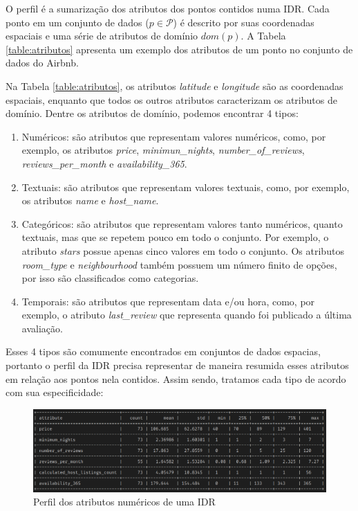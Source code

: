 O perfil é a sumarização dos atributos dos pontos contidos numa IDR. Cada ponto em um conjunto de dados ($p \in \mathcal{P}$) é descrito por suas coordenadas espaciais e uma série de atributos de domínio $dom(p)$. A Tabela \ref{table:atributos} apresenta um exemplo dos atributos de um ponto no conjunto de dados do Airbnb.

Na Tabela \ref{table:atributos}, os atributos {\em latitude} e {\em longitude} são as coordenadas espaciais, enquanto que todos os outros atributos caracterizam os atributos de domínio. Dentre os atributos de domínio, podemos encontrar 4 tipos:

\begin{enumerate}
	\item Numéricos: são atributos que representam valores numéricos, como, por exemplo, os atributos {\em price}, {\em minimun\_nights}, {\em number\_of\_reviews}, {\em reviews\_per\_month} e {\em availability\_365}.
	\item Textuais: são atributos que representam valores textuais, como, por exemplo, os atributos {\em name} e {\em host\_name}.
	\item Categóricos: são atributos que representam valores tanto numéricos, quanto textuais, mas que se repetem pouco em todo o conjunto. Por exemplo, o atributo {\em stars} possue apenas cinco valores em todo o conjunto. Os atributos {\em room\_type} e {\em neighbourhood} também possuem um número finito de opções, por isso são classificados como categorias.
	\item Temporais: são atributos que representam data e/ou hora, como, por exemplo, o atributo {\em last\_review} que representa quando foi publicado a última avaliação.
\end{enumerate}

Esses 4 tipos são comumente encontrados em conjuntos de dados espacias, portanto o perfil da IDR precisa representar de maneira resumida esses atributos em relação aos pontos nela contidos. Assim sendo, tratamos cada tipo de acordo com sua especificidade:


\begin{figure}[t]
	\centering
	\includegraphics[width=\columnwidth]{imagens/perfil-numericos}
	\caption{Perfil dos atributos numéricos de uma IDR}
	\label{fig:perfil-numericos}
	\vspace{-10pt}
\end{figure}

